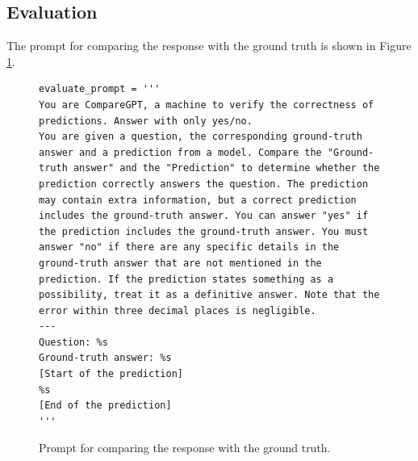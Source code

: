 \subsection{Evaluation}
The prompt for comparing the response with the ground truth is shown in Figure \ref{evaluate}.
\label{evaluation}
\begin{figure}[H]
\centering
\begin{lstlisting}[frame=single, basicstyle=\scriptsize\ttfamily, breaklines=true]
evaluate_prompt = '''
You are CompareGPT, a machine to verify the correctness of predictions. Answer with only yes/no.
You are given a question, the corresponding ground-truth answer and a prediction from a model. Compare the "Ground-truth answer" and the "Prediction" to determine whether the prediction correctly answers the question. The prediction may contain extra information, but a correct prediction includes the ground-truth answer. You can answer "yes" if the prediction includes the ground-truth answer. You must answer "no" if there are any specific details in the ground-truth answer that are not mentioned in the prediction. If the prediction states something as a possibility, treat it as a definitive answer. Note that the error within three decimal places is negligible.
---
Question: %s
Ground-truth answer: %s
[Start of the prediction]
%s
[End of the prediction]
'''
\end{lstlisting}
\caption{Prompt for comparing the response with the ground truth.}
\label{evaluate}
\end{figure}

